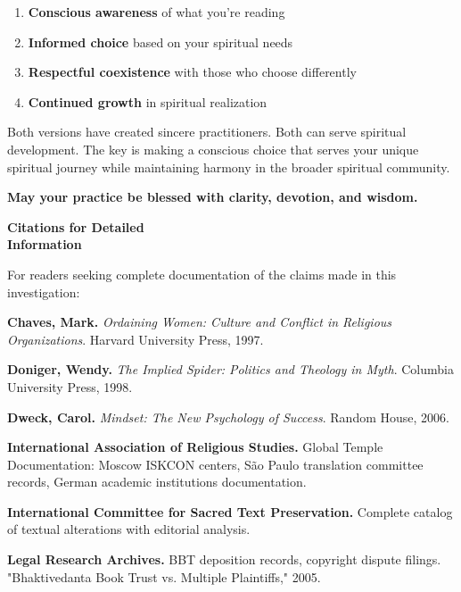 \documentclass[11pt,twoside]{book}
\makeatletter
\def\cleardoublepage{\clearpage\if@twoside \ifodd\c@page\else\hbox{}\thispagestyle{empty}\newpage\if@twocolumn\hbox{}\newpage\fi\fi\fi}
\makeatother
\begin{document}
\begin{enumerate}
\item \textbf{\textbf{Conscious awareness}} of what you're reading
\item \textbf{\textbf{Informed choice}} based on your spiritual needs
\item \textbf{\textbf{Respectful coexistence}} with those who choose differently
\item \textbf{\textbf{Continued growth}} in spiritual realization
\end{enumerate}

Both versions have created sincere practitioners. Both can serve spiritual development. The key is making a conscious choice that serves your unique spiritual journey while maintaining harmony in the broader spiritual community.

\textbf{May your practice be blessed with clarity, devotion, and wisdom.}

\clearpage
\pagestyle{sectionopening}
\cleardoublepage
\thispagestyle{empty}
\vspace*{0.25\textheight}
\begin{center}
{\Huge\bfseries Citations for Detailed\\[1.5cm]Information}
\end{center}
\vspace*{\fill}
\cleardoublepage

For readers seeking complete documentation of the claims made in this investigation:


\textbf{\textbf{Chaves, Mark.}} \emph{Ordaining Women: Culture and Conflict in Religious Organizations}. Harvard University Press, 1997.

\textbf{\textbf{Doniger, Wendy.}} \emph{The Implied Spider: Politics and Theology in Myth}. Columbia University Press, 1998.

\textbf{\textbf{Dweck, Carol.}} \emph{Mindset: The New Psychology of Success}. Random House, 2006.

\textbf{\textbf{International Association of Religious Studies.}} Global Temple Documentation: Moscow ISKCON centers, São Paulo translation committee records, German academic institutions documentation.

\textbf{\textbf{International Committee for Sacred Text Preservation.}} Complete catalog of textual alterations with editorial analysis.

\textbf{\textbf{Legal Research Archives.}} BBT deposition records, copyright dispute filings. "Bhaktivedanta Book Trust vs. Multiple Plaintiffs," 2005.
\end{document}
